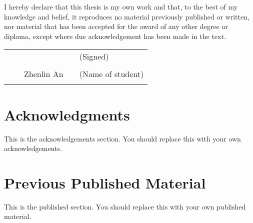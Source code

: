  \label{sec:certificate}
  \begin{center}
  \end{center}
  \vspace{1.0cm}
  \noindent
I hereby declare that this thesis is my own work and that, to the best of
my knowledge and belief, it reproduces no material previously
published or written, nor material that has been accepted for the award
of any other degree or diploma, except where due acknowledgement has
been made in the text.
  \par\noindent
  \begin{flushleft}
    \begin{tabular}{l p{0.5in} p{1in} p{0.5in} l}
      & & & & (Signed) \\
      \cline{1-4}\\
      & & {Zhenlin An} & & (Name of student) \\
      \cline{1-4}\\
    \end{tabular}
  \end{flushleft}
  \vspace{\fill}


\cleardoublepage
\setcounter{savepage}{\thepage}
\begin{abstractpage}

\end{abstractpage}

% 

\cleardoublepage

\section*{Acknowledgments}

This is the acknowledgements section. You should replace this with your
own acknowledgements.

\cleardoublepage

\section*{Previous Published Material}

This is the published section. You should replace this with your
own published material.

